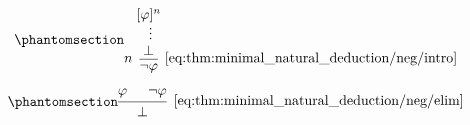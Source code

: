 \begin{proposition}
\begin{thmenum}
    \begin{minipage}{0.45\textwidth}
      \begin{equation*}\taglabel[\textrm{R} \( \neg^+ \)]{eq:thm:minimal_natural_deduction/neg/intro}
        \begin{prooftree}
          \hypo{ [\varphi]^n }
          \ellipsis {} { \bot }
          \infer[left label=\( n \)]1[\ref{eq:thm:minimal_natural_deduction/neg/intro}]{ \neg \varphi }
        \end{prooftree}
      \end{equation*}
    \end{minipage}
    \hfill
    \begin{minipage}{0.45\textwidth}
      \begin{equation*}\taglabel[\textrm{R} \( \neg^- \)]{eq:thm:minimal_natural_deduction/neg/elim}
        \begin{prooftree}
          \hypo{ \varphi }
          \hypo{ \neg \varphi }
          \infer2[\ref{eq:thm:minimal_natural_deduction/neg/elim}]{ \bot }
        \end{prooftree}
      \end{equation*}
    \end{minipage}
  \end{thmenum}
\end{proposition}
